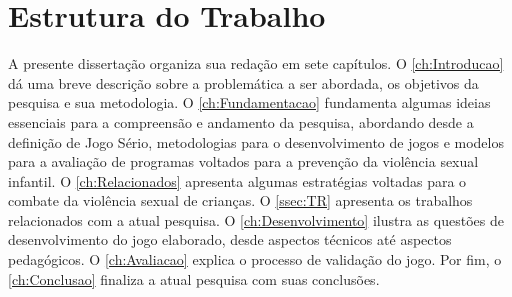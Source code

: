
\section{Estrutura do Trabalho}\label{ch:Estrutura}

A presente dissertação organiza sua redação em sete capítulos. O \autoref{ch:Introducao} dá uma breve descrição sobre a problemática a ser abordada, os objetivos da pesquisa e sua metodologia. O \autoref{ch:Fundamentacao} fundamenta algumas ideias essenciais para a compreensão e andamento da pesquisa, abordando desde a definição de Jogo Sério, metodologias para o desenvolvimento de jogos e modelos para a avaliação de programas voltados para a prevenção da violência sexual infantil. O \autoref{ch:Relacionados} apresenta algumas estratégias voltadas para o combate da violência sexual de crianças. O \autoref{ssec:TR} apresenta os trabalhos relacionados com a atual pesquisa. O \autoref{ch:Desenvolvimento} ilustra as questões de desenvolvimento do jogo elaborado, desde aspectos técnicos até aspectos pedagógicos. O \autoref{ch:Avaliacao} explica o processo de validação do jogo. Por fim, o \autoref{ch:Conclusao} finaliza a atual pesquisa com suas conclusões.






